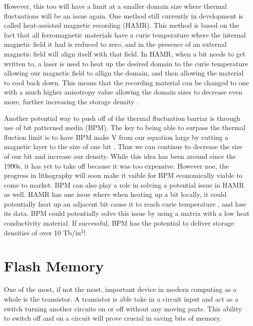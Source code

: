 \documentclass[ notitlepage, numerical, 11pt]{revtex4-1} %
\begin{document}
However, this too will have a limit at a smaller domain size where thermal fluctuations will be an issue again. One method still currently in development is called heat-assisted magnetic recording (HAMR). This method is based on the fact that all ferromagnetic materials have a curie temperature where the internal magnetic field it had is reduced to zero, and in the presence of an external magnetic field will align itself with that field. In HAMR, when a bit needs to get written to, a laser is used to heat up the desired domain to the curie temperature allowing our magnetic field to allign the domain, and then allowing the material to cool back down. This means that the recording material can be changed to one with a much higher anisotropy value allowing the domain sizes to decrease even more, further increasing the storage density \cite{hamr}.

Another potential way to push off of the thermal fluctuation barriar is through use of bit patterned media (BPM). The key to being able to surpass the thermal fluction limit is to have BPM make V from our equation large by cutting a magnetic layer to the size of one bit \cite{btm}.  Thus we can continue to decrease the size of our bit and increase our density. While this idea has been around since the 1990s, it has yet to take off because it was too expensive. However noe, the progress in lithography will soon make it vaible for BPM economically viable to come to market. BPM can also play a role in solving a potential issue in HAMR as well. HAMR has one issue where when heating up a bit locally, it could potentially heat up an adjacent bit cause it to reach curie temperature , and lose its data. BPM could potentially solve this issue by using a matrix with a low heat conductivity material. If successful, BPM has the potential to deliver storage densities of over 10 Tb/in$^2$!


\section{Flash Memory}

One of the most, if not the most, important device in modern computing as a whole is the transistor. A transistor is able take in a circuit input and act as a switch turning another circuits on or off without any moving parts. This ability to switch off and on a circuit will prove crucial in saving bits of memory.
\end{document}
